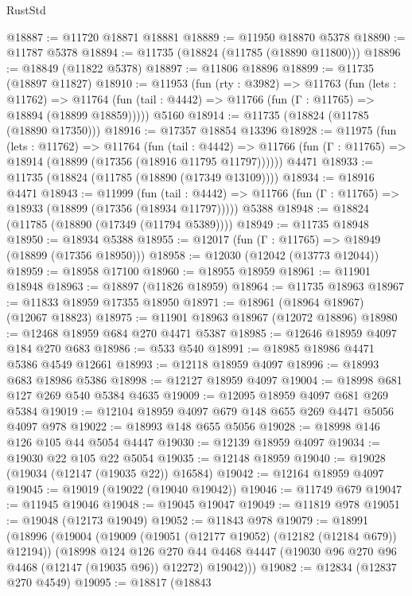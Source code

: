 \begin{lexlean}{RustStd}
\begin{coremodule}
@18887 := @11720 @18871 @18881
@18889 := @11950 @18870 @5378
@18890 := @11787 @5378
@18894 := @11735 (@18824 (@11785 (@18890 @11800)))
@18896 := @18849 (@11822 @5378)
@18897 := @11806 @18896
@18899 := @11735 (@18897 @11827)
@18910 := @11953
    (fun (rty : @3982) =>
    @11763
      (fun (lets : @11762) =>
      @11764 (fun (tail : @4442) => @11766 (fun (Γ : @11765) => @18894 (@18899 @18859)))))
    @5160
@18914 := @11735 (@18824 (@11785 (@18890 @17350)))
@18916 := @17357 @18854 @13396
@18928 := @11975
    (fun (lets : @11762) =>
    @11764
      (fun (tail : @4442) =>
      @11766 (fun (Γ : @11765) => @18914 (@18899 (@17356 (@18916 @11795 @11797))))))
    @4471
@18933 := @11735 (@18824 (@11785 (@18890 (@17349 @13109))))
@18934 := @18916 @4471
@18943 := @11999
    (fun (tail : @4442) => @11766 (fun (Γ : @11765) => @18933 (@18899 (@17356 (@18934 @11797)))))
    @5388
@18948 := @18824 (@11785 (@18890 (@17349 (@11794 @5389))))
@18949 := @11735 @18948
@18950 := @18934 @5388
@18955 := @12017 (fun (Γ : @11765) => @18949 (@18899 (@17356 @18950)))
@18958 := @12030 (@12042 (@13773 @12044))
@18959 := @18958 @17100
@18960 := @18955 @18959
@18961 := @11901 @18948
@18963 := @18897 (@11826 @18959)
@18964 := @11735 @18963
@18967 := @11833 @18959 @17355 @18950
@18971 := @18961 (@18964 @18967) (@12067 @18823)
@18975 := @11901 @18963 @18967 (@12072 @18896)
@18980 := @12468 @18959 @684 @270 @4471 @5387
@18985 := @12646 @18959 @4097 @184 @270 @683
@18986 := @533 @540
@18991 := @18985 @18986 @4471 @5386 @4549 @12661
@18993 := @12118 @18959 @4097
@18996 := @18993 @683 @18986 @5386
@18998 := @12127 @18959 @4097
@19004 := @18998 @681 @127 @269 @540 @5384 @4635
@19009 := @12095 @18959 @4097 @681 @269 @5384
@19019 := @12104 @18959 @4097 @679 @148 @655 @269 @4471 @5056 @4097 @978
@19022 := @18993 @148 @655 @5056
@19028 := @18998 @146 @126 @105 @44 @5054 @4447
@19030 := @12139 @18959 @4097
@19034 := @19030 @22 @105 @22 @5054
@19035 := @12148 @18959
@19040 := @19028 (@19034 (@12147 (@19035 @22)) @16584)
@19042 := @12164 @18959 @4097
@19045 := @19019 (@19022 (@19040 @19042))
@19046 := @11749 @679
@19047 := @11945 @19046
@19048 := @19045 @19047
@19049 := @11819 @978
@19051 := @19048 (@12173 @19049)
@19052 := @11843 @978
@19079 := @18991
    (@18996
      (@19004
        (@19009 (@19051 (@12177 @19052) (@12182 (@12184 @679)) @12194))
        (@18998
          @124
          @126
          @270
          @44
          @4468
          @4447
          (@19030 @96 @270 @96 @4468 (@12147 (@19035 @96)) @12272)
          @19042)))
@19082 := @12834 (@12837 @270 @4549)
@19095 := @18817
    (@18843

\end{coremodule}
\end{lexlean}
